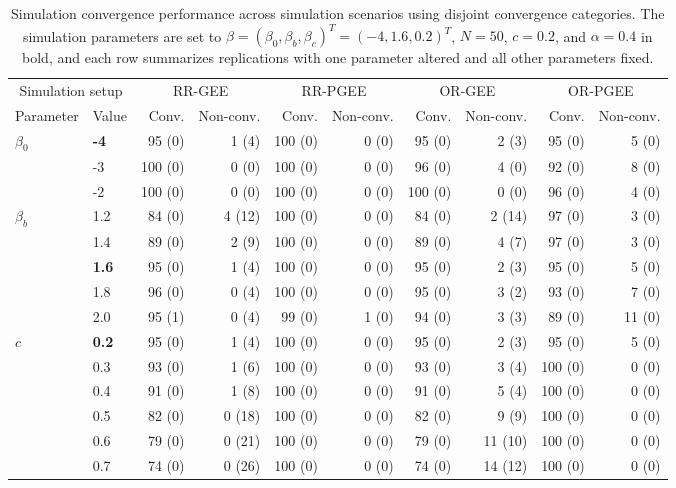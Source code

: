 \begin{table}[htbp]
\centering
\scriptsize
\setlength{\tabcolsep}{3pt}
\renewcommand{\arraystretch}{1.15}
\caption{Simulation convergence performance across simulation scenarios using disjoint convergence categories. The simulation parameters are set to $\beta = (\beta_0, \beta_b, \beta_c)^T = (-4, 1.6, 0.2)^T$, $N = 50$, $c = 0.2$, and $\alpha = 0.4$ in bold, and each row summarizes replications with one parameter altered and all other parameters fixed.}
\begin{tabular}{ll|rr|rr|rr|rr}
\hline
\multicolumn{2}{c|}{Simulation setup} & \multicolumn{2}{c|}{RR-GEE} & \multicolumn{2}{c|}{RR-PGEE} & \multicolumn{2}{c|}{OR-GEE} & \multicolumn{2}{c}{OR-PGEE} \\
Parameter & Value & Conv. & Non-conv. & Conv. & Non-conv. & Conv. & Non-conv. & Conv. & Non-conv. \\
\hline
$\beta_0$ & \textbf{-4} & 95 (0) & 1 (4) & 100 (0) & 0 (0) & 95 (0) & 2 (3) & 95 (0) & 5 (0) \\
 & -3 & 100 (0) & 0 (0) & 100 (0) & 0 (0) & 96 (0) & 4 (0) & 92 (0) & 8 (0) \\
 & -2 & 100 (0) & 0 (0) & 100 (0) & 0 (0) & 100 (0) & 0 (0) & 96 (0) & 4 (0) \\
\hline
$\beta_b$ & 1.2 & 84 (0) & 4 (12) & 100 (0) & 0 (0) & 84 (0) & 2 (14) & 97 (0) & 3 (0) \\
 & 1.4 & 89 (0) & 2 (9) & 100 (0) & 0 (0) & 89 (0) & 4 (7) & 97 (0) & 3 (0) \\
 & \textbf{1.6} & 95 (0) & 1 (4) & 100 (0) & 0 (0) & 95 (0) & 2 (3) & 95 (0) & 5 (0) \\
 & 1.8 & 96 (0) & 0 (4) & 100 (0) & 0 (0) & 95 (0) & 3 (2) & 93 (0) & 7 (0) \\
 & 2.0 & 95 (1) & 0 (4) & 99 (0) & 1 (0) & 94 (0) & 3 (3) & 89 (0) & 11 (0) \\
\hline
$c$ & \textbf{0.2} & 95 (0) & 1 (4) & 100 (0) & 0 (0) & 95 (0) & 2 (3) & 95 (0) & 5 (0) \\
 & 0.3 & 93 (0) & 1 (6) & 100 (0) & 0 (0) & 93 (0) & 3 (4) & 100 (0) & 0 (0) \\
 & 0.4 & 91 (0) & 1 (8) & 100 (0) & 0 (0) & 91 (0) & 5 (4) & 100 (0) & 0 (0) \\
 & 0.5 & 82 (0) & 0 (18) & 100 (0) & 0 (0) & 82 (0) & 9 (9) & 100 (0) & 0 (0) \\
 & 0.6 & 79 (0) & 0 (21) & 100 (0) & 0 (0) & 79 (0) & 11 (10) & 100 (0) & 0 (0) \\
 & 0.7 & 74 (0) & 0 (26) & 100 (0) & 0 (0) & 74 (0) & 14 (12) & 100 (0) & 0 (0) \\

\end{tabular}
\end{table}
